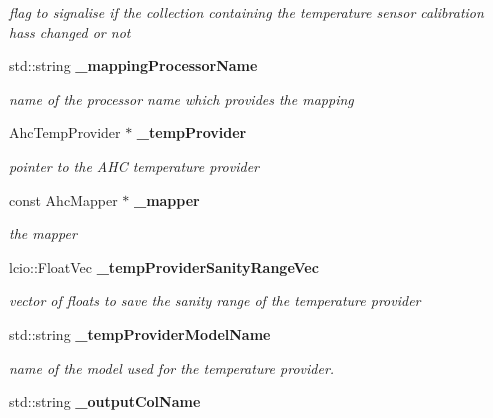 \begin{DoxyCompactItemize}
\begin{DoxyCompactList}\small\item\em flag to signalise if the collection containing the temperature sensor calibration hass changed or not \item\end{DoxyCompactList}\item 
std::string {\bf \_\-mappingProcessorName}\label{classCALICE_1_1SiPMTemperatureProcessor_a1068bf0ac9a36c77aeefaf03514bd5e8}

\begin{DoxyCompactList}\small\item\em name of the processor name which provides the mapping \item\end{DoxyCompactList}\item 
AhcTempProvider $\ast$ {\bf \_\-tempProvider}\label{classCALICE_1_1SiPMTemperatureProcessor_ab874014a3ab396472b48b7533c9316b5}

\begin{DoxyCompactList}\small\item\em pointer to the AHC temperature provider \item\end{DoxyCompactList}\item 
const AhcMapper $\ast$ {\bf \_\-mapper}\label{classCALICE_1_1SiPMTemperatureProcessor_addf40c4cb0947b2bb138012bfcf31de6}

\begin{DoxyCompactList}\small\item\em the mapper \item\end{DoxyCompactList}\item 
lcio::FloatVec {\bf \_\-tempProviderSanityRangeVec}\label{classCALICE_1_1SiPMTemperatureProcessor_a0bb6fba3c3e3cab14180259a473fe526}

\begin{DoxyCompactList}\small\item\em vector of floats to save the sanity range of the temperature provider \item\end{DoxyCompactList}\item 
std::string {\bf \_\-tempProviderModelName}
\begin{DoxyCompactList}\small\item\em name of the model used for the temperature provider. \item\end{DoxyCompactList}\item 
std::string {\bf \_\-outputColName}\label{classCALICE_1_1SiPMTemperatureProcessor_a583ed1ec93ef7e553c95ea291b51cb55}


\end{DoxyCompactItemize}
